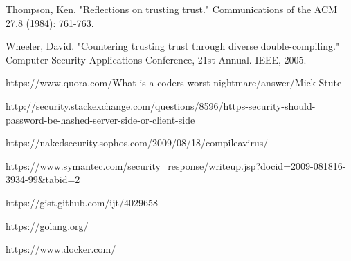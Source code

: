 \documentclass[10pt]{sigplanconf}
\begin{document}
\begin{thebibliography}{}
\softraggedright

Thompson, Ken. "Reflections on trusting trust." Communications of the ACM 27.8 (1984): 761-763.

Wheeler, David. "Countering trusting trust through diverse double-compiling." Computer Security Applications Conference, 21st Annual. IEEE, 2005.

https://www.quora.com/What-is-a-coders-worst-nightmare/answer/Mick-Stute

http://security.stackexchange.com/questions/8596/https-security-should-password-be-hashed-server-side-or-client-side

https://nakedsecurity.sophos.com/2009/08/18/compileavirus/

https://www.symantec.com/security\_response/writeup.jsp?docid=2009-081816-3934-99\&tabid=2

https://gist.github.com/ijt/4029658

https://golang.org/

https://www.docker.com/
\end{thebibliography}
\end{document}
